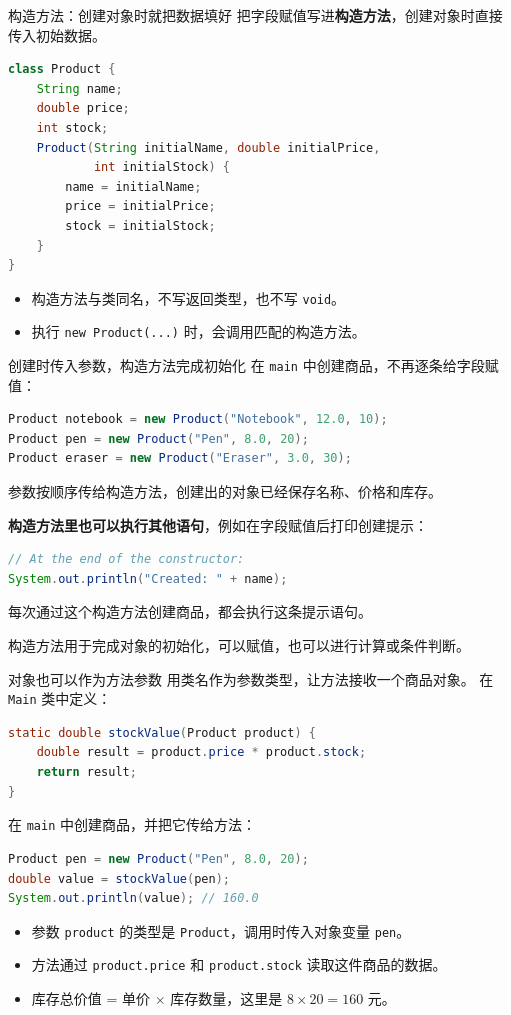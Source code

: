 \documentclass[aspectratio=169]{beamer}
\begin{document}
\begin{frame}[fragile]{构造方法：创建对象时就把数据填好}
  把字段赋值写进\textbf{构造方法}，创建对象时直接传入初始数据。
  \begin{lstlisting}[language=Java]
class Product {
    String name;
    double price;
    int stock;
    Product(String initialName, double initialPrice,
            int initialStock) {
        name = initialName;
        price = initialPrice;
        stock = initialStock;
    }
}
  \end{lstlisting}
  \begin{itemize}
    \item 构造方法与类\alert{同名}，不写返回类型，也不写 \texttt{void}。
    \item 执行 \texttt{new Product(...)} 时，会调用匹配的构造方法。
  \end{itemize}
\end{frame}

\begin{frame}[fragile]{创建时传入参数，构造方法完成初始化}
  在 \texttt{main} 中创建商品，不再逐条给字段赋值：
  \begin{lstlisting}[language=Java]
Product notebook = new Product("Notebook", 12.0, 10);
Product pen = new Product("Pen", 8.0, 20);
Product eraser = new Product("Eraser", 3.0, 30);
  \end{lstlisting}
  参数按顺序传给构造方法，创建出的对象已经保存名称、价格和库存。
  \par\medskip
  \textbf{构造方法里也可以执行其他语句}，例如在字段赋值后打印创建提示：
  \begin{lstlisting}[language=Java]
// At the end of the constructor:
System.out.println("Created: " + name);
  \end{lstlisting}
  每次通过这个构造方法创建商品，都会执行这条提示语句。
  \par\medskip
  构造方法用于\alert{完成对象的初始化}，可以赋值，也可以进行计算或条件判断。
\end{frame}

\begin{frame}[fragile]{对象也可以作为方法参数}
  用类名作为参数类型，让方法接收一个商品对象。
  在 \texttt{Main} 类中定义：
  \begin{lstlisting}[language=Java]
static double stockValue(Product product) {
    double result = product.price * product.stock;
    return result;
}
  \end{lstlisting}
  在 \texttt{main} 中创建商品，并把它传给方法：
  \begin{lstlisting}[language=Java]
Product pen = new Product("Pen", 8.0, 20);
double value = stockValue(pen);
System.out.println(value); // 160.0
  \end{lstlisting}
  \begin{itemize}
    \item 参数 \texttt{product} 的类型是 \texttt{Product}，调用时传入对象变量 \texttt{pen}。
    \item 方法通过 \texttt{product.price} 和 \texttt{product.stock} 读取这件商品的数据。
    \item 库存总价值 = 单价 $\times$ 库存数量，这里是 $8 \times 20 = 160$ 元。
  \end{itemize}
\end{frame}
\end{document}

